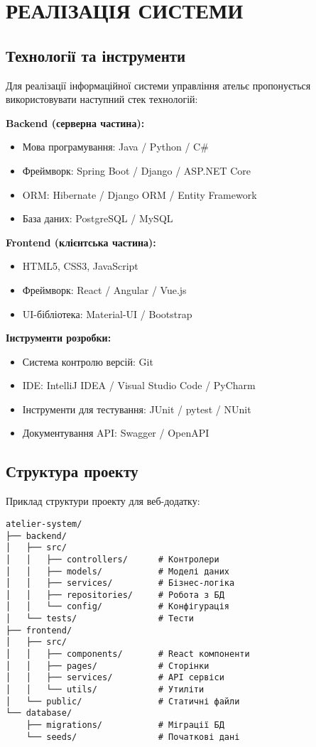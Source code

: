 \documentclass[14pt,a4paper]{extarticle}
\begin{document}
\newpage
\section{РЕАЛІЗАЦІЯ СИСТЕМИ}

\subsection{Технології та інструменти}

Для реалізації інформаційної системи управління ательє пропонується використовувати наступний стек технологій:

\textbf{Backend (серверна частина):}
\begin{itemize}
    \item Мова програмування: Java / Python / C\#
    \item Фреймворк: Spring Boot / Django / ASP.NET Core
    \item ORM: Hibernate / Django ORM / Entity Framework
    \item База даних: PostgreSQL / MySQL
\end{itemize}

\textbf{Frontend (клієнтська частина):}
\begin{itemize}
    \item HTML5, CSS3, JavaScript
    \item Фреймворк: React / Angular / Vue.js
    \item UI-бібліотека: Material-UI / Bootstrap
\end{itemize}

\textbf{Інструменти розробки:}
\begin{itemize}
    \item Система контролю версій: Git
    \item IDE: IntelliJ IDEA / Visual Studio Code / PyCharm
    \item Інструменти для тестування: JUnit / pytest / NUnit
    \item Документування API: Swagger / OpenAPI
\end{itemize}

\subsection{Структура проекту}

Приклад структури проекту для веб-додатку:

\begin{verbatim}
atelier-system/
├── backend/
│   ├── src/
│   │   ├── controllers/      # Контролери
│   │   ├── models/           # Моделі даних
│   │   ├── services/         # Бізнес-логіка
│   │   ├── repositories/     # Робота з БД
│   │   └── config/           # Конфігурація
│   └── tests/                # Тести
├── frontend/
│   ├── src/
│   │   ├── components/       # React компоненти
│   │   ├── pages/            # Сторінки
│   │   ├── services/         # API сервіси
│   │   └── utils/            # Утиліти
│   └── public/               # Статичні файли
└── database/
    ├── migrations/           # Міграції БД
    └── seeds/                # Початкові дані
\end{verbatim}
\end{document}
